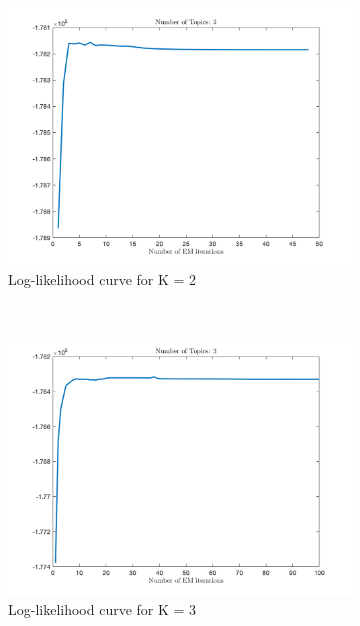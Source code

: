 \documentclass[12pt]{article}
\begin{document}
\begin{figure}[h]
	\centering
	\begin{subfigure}{0.45\textwidth}
		\includegraphics[width=\textwidth]{images/Q_2_topics.png}
		\caption{Log-likelihood curve for K = 2}
		\label{fig:Q2}
	\end{subfigure}
	~	
	\begin{subfigure}{0.45\textwidth}
		\includegraphics[width=\textwidth]{images/Q_3_topics.png}
		\caption{Log-likelihood curve for K = 3}
		\label{fig:Q3}
	\end{subfigure}
	~	
	\begin{subfigure}{0.45\textwidth}

\end{subfigure}
\end{figure}
\end{document}
